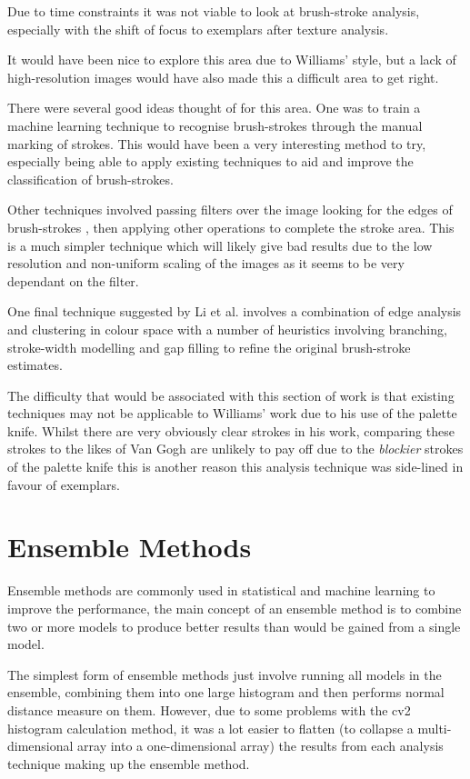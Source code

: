 Due to time constraints it was not viable to look at brush-stroke analysis, especially with the
shift of focus to exemplars after texture analysis.

It would have been nice to explore this area due to Williams' style, but a lack of high-resolution
images would have also made this a difficult area to get right.

There were several good ideas thought of for this area. One was to train a machine learning 
technique to recognise brush-strokes through the manual marking of strokes. This would have been a
very interesting method to try, especially being able to apply existing techniques to aid and
improve the classification of brush-strokes.

Other techniques involved passing filters over the image looking for the edges of brush-strokes
\cite{Berezhnoy2009Automatic}, then applying other operations to complete the stroke area. This
is a much simpler technique which will likely give bad results due to the low resolution and
non-uniform scaling of the images as it seems to be very dependant on the filter.

One final technique suggested by Li et al.\cite{Li2012Rhythmic} involves a combination of edge
analysis and clustering in colour space with a number of heuristics involving branching, 
stroke-width modelling and gap filling to refine the original brush-stroke estimates.

The difficulty that would be associated with this section of work is that existing techniques may
not be applicable to Williams' work due to his use of the palette knife. Whilst there are very
obviously clear strokes in his work, comparing these strokes to the likes of Van Gogh are unlikely
to pay off due to the \emph{blockier} strokes of the palette knife this is another reason this analysis
technique was side-lined in favour of exemplars.


\section{Ensemble Methods}
Ensemble methods are commonly used in statistical and machine learning to improve the performance,
the main concept of an ensemble method is to combine two or more models to produce better results
than would be gained from a single model.

The simplest form of ensemble methods just involve running all models in the ensemble, combining them into
one large histogram and then performs normal distance measure on them. However, due to some 
problems with the \gls{cv2} histogram calculation method, it was a lot easier to flatten
(to collapse a multi-dimensional array into a one-dimensional array) the results from each 
analysis technique making up the ensemble method.

